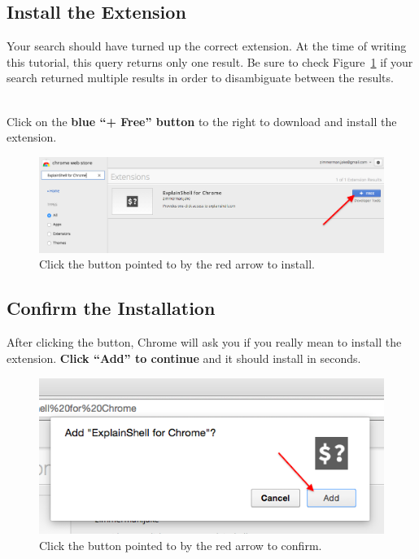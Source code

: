\documentclass[11pt]{article}
\begin{document}
\subsection{Install the Extension}
Your search should have turned up the correct extension. At the time of writing this tutorial, this query returns only one result. Be sure to check Figure~\ref{install} if your search returned multiple results in order to disambiguate between the results.

\mbox{}\\
\noindent
Click on the \textbf{blue ``+ Free'' button} to the right to download and install the extension.

\vspace{0.2in}
\begin{figure}[H]
  \begin{center}
    \includegraphics[width=\textwidth, height=\textheight, keepaspectratio]{03install}
  \end{center}
  \caption{Click the button pointed to by the red arrow to install.}
  \label{install}
\end{figure}
\vspace{0.2in}

\subsection{Confirm the Installation}
After clicking the button, Chrome will ask you if you really mean to install the extension. \textbf{Click ``Add'' to continue} and it should install in seconds.

\vspace{0.2in}
\begin{figure}[H]
  \begin{center}
    \includegraphics[height=2in, keepaspectratio]{04confirm}
  \end{center}
  \caption{Click the button pointed to by the red arrow to confirm.}
  \label{confirm}
\end{figure}
\vspace{0.2in}
\end{document}
